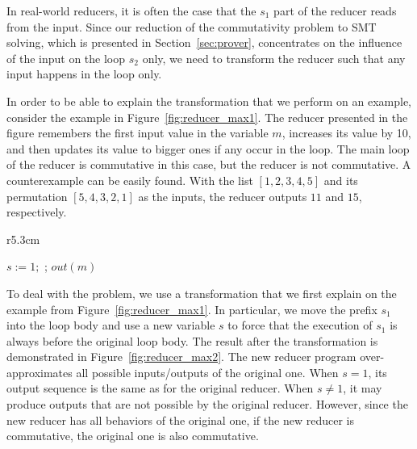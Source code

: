 \documentclass{llncs}
\newcommand{\cur}{cur()}
\begin{document}
In real-world reducers, it is often the case that the $s_1$ part of the reducer
reads from the input. Since our reduction of the commutativity problem to SMT
solving, which is presented in Section~\ref{sec:prover}, concentrates on the
influence of the input on the loop $s_2$ only, we need to transform the reducer
such that any input happens in the loop only. 

In order to be able to explain the transformation that we perform on an example,
consider the example in Figure~\ref{fig:reducer_max1}. The reducer presented in
the figure remembers the first input value in the variable $m$, increases its
value by 10, and then updates its value to bigger ones if any occur in the loop.
The main loop of the reducer is commutative in this case, but the reducer is not
commutative. A counterexample can be easily found. With the list $[1,2,3,4,5]$
and its permutation $[5,4,3,2,1]$ as the inputs, the reducer outputs $11$ and
$15$, respectively.

\begin{wrapfigure}[12]{r}{5.3cm}
	\vspace{-9mm}
	\begin{algorithm}[H]
		$s:=1;$\;
		\Loop{}{
			\uIf{$s=1$}{$m := \cur + 10; s:= 2$}
			\uElse{
				$t:=\cur$\;
				\uIf{ $t > m$}{
					$m := t$ \;
				}
			}
		};
		$out(m)$
	\end{algorithm}	
	\vspace{-2mm}
	\caption{The max$^{+\mathtt{fix}}$ reducer.}
	\vspace{-4mm}
	\label{fig:reducer_max2}
\end{wrapfigure}

To deal with the problem, we use a transformation that we first explain on the
example from Figure~\ref{fig:reducer_max1}. In particular, we move the prefix
$s_1$ into the loop body and use a new variable $s$ to force that the execution
of $s_1$ is always before the original loop body. The result after the
transformation is demonstrated in Figure~\ref{fig:reducer_max2}. The new reducer
program over-approximates all possible inputs/outputs of the original one. When
$s=1$, its output sequence is the same as for the original reducer. When $s\neq
1$, it may produce outputs that are not possible by the original reducer.
However, since the new reducer has all behaviors of the original one, if the new
reducer is commutative, the original one is also commutative.

%
\end{document}
